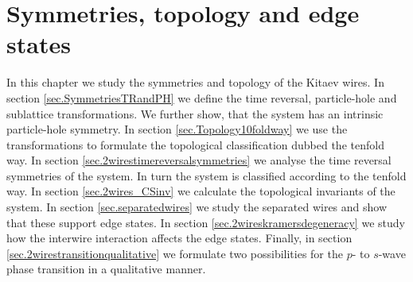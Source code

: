 
\chapter{Symmetries, topology and edge states } %

\label{Chapter5} %


In this chapter we study the symmetries and topology of the Kitaev wires. In section \ref{sec.SymmetriesTRandPH} we define the time reversal, particle-hole and sublattice transformations. We further show, that the system has an intrinsic particle-hole symmetry. In section \ref{sec.Topology10foldway} we use the transformations to formulate the topological classification dubbed the tenfold way. In section \ref{sec.2wirestimereversalsymmetries} we analyse the time reversal symmetries of the system. In turn the system is classified according to the tenfold way. In section \ref{sec.2wires_CSinv} we calculate the topological invariants of the system. In section \ref{sec.separatedwires} we study the separated wires and show that these support edge states. In section \ref{sec.2wireskramersdegeneracy} we study how the interwire interaction affects the edge states. Finally, in section \ref{sec.2wirestransitionqualitative} we formulate two possibilities for the $p$- to $s$-wave phase transition in a qualitative manner. 


